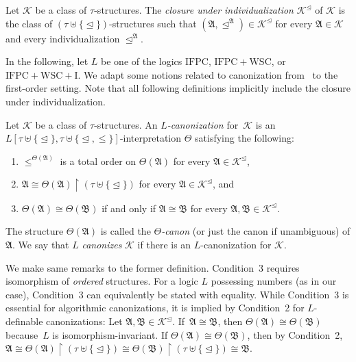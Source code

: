 \documentclass[]{lmcs}
\newcommand{\defining}[1]{\emph{#1}}
\newcommand{\iso}{\cong}
\newcommand{\disunion}{\mathbin{\uplus}}
\newcommand{\set}[1]{\lbrace #1 \rbrace}
\newcommand{\interpret}{\Theta}
\newcommand{\Struct}{\mathfrak{A}}
\newcommand{\StructA}{\mathfrak{A}}
\newcommand{\StructB}{\mathfrak{B}}
\newcommand{\reduct}[2]{#1 \upharpoonright #2}
\newcommand{\GraphClass}{\mathcal{K}}
\newcommand{\sig}{\tau}
\newcommand{\IFPC}{\ensuremath{\mathrm{IFPC}}}
\newcommand{\IFPCWSC}{\ensuremath{\mathrm{IFPC{+}WSC}}}
\newcommand{\IFPCWSCI}{\ensuremath{\mathrm{IFPC{+}WSC{+}I}}}
\newcommand{\indRel}{\trianglelefteq}
\newcommand{\indClosure}[1]{#1^\indRel}
\begin{document}
\begin{defi}
	Let $\GraphClass$ be a class of $\sig$-structures.
	The \defining{closure under individualization} $\indClosure{\GraphClass}$ of $\GraphClass$
	is the class
	of $(\sig \disunion \set{\indRel})$-structures
	such that ${(\StructA, \indRel^\StructA) \in \indClosure{\GraphClass}}$
	for every $\StructA \in \GraphClass$
	and every individualization $\indRel^\StructA$.
\end{defi}

In the following,
let $L$ be one of the logics \IFPC{}, \IFPCWSC{}, or \IFPCWSCI{}.
We adapt some notions related to canonization from~\cite{LichterSchweitzer24}
to the first-order setting.
Note that all following definitions implicitly include the closure under individualization.
\begin{defi}[Canonization]
	Let $\GraphClass$ be a class of $\sig$-structures.
	An \defining{$L$-canonization} for~$\GraphClass$ is an
	$L[\sig\disunion\set{\indRel}, \sig\disunion\set{\indRel,\leq}]$-interpretation $\interpret$
	satisfying the following:
	\begin{enumerate}
		\item $\leq^{\interpret(\StructA)}$ is a total order on $\interpret(\StructA)$ for every $\StructA \in \indClosure{\GraphClass}$,
		\item $\StructA \iso \reduct{\interpret(\StructA)}{(\sig\disunion\set{\indRel})}$ for every $\StructA \in \indClosure{\GraphClass}$, and
		\item $\interpret(\StructA) \iso \interpret(\StructB)$ if and only if $\StructA \iso \StructB$
		for every $\StructA,\StructB \in \indClosure{\GraphClass}$.
	\end{enumerate}
	The structure $\interpret(\Struct)$ is called the \defining{$\interpret$-canon} (or just the canon if unambiguous) of $\Struct$.
	We say that $L$ \defining{canonizes} $\GraphClass$
	if there is an $L$-canonization for $\GraphClass$.
\end{defi}

We make same remarks to the former definition.
Condition~3 requires isomorphism of \emph{ordered} structures.
For a logic $L$ possessing numbers (as in our case),
Condition~3 can equivalently be stated with equality.
While Condition~3 is essential for algorithmic canonizations,
it is implied by Condition~2 for $L$-definable canonizations:
Let $\StructA, \StructB \in \indClosure{\GraphClass}$.
If~$\StructA \iso \StructB$,
then $\interpret(\StructA) \iso \interpret(\StructB)$
because~$L$ is isomorphism-invariant.
If $\interpret(\StructA) \iso \interpret(\StructB)$,
then by Condition~2,
$\StructA \iso \reduct{\interpret(\StructA)}{(\sig\disunion\set{\indRel})}
\iso \reduct{\interpret(\StructB)}{(\sig\disunion\set{\indRel})} \iso \StructB$.
\end{document}
